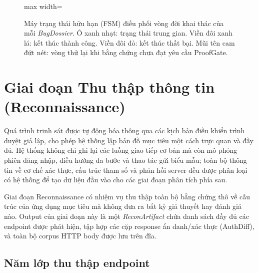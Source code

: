\begin{figure}[H]
\begin{adjustbox}{max width=\linewidth}
\end{adjustbox}
\caption{Máy trạng thái hữu hạn (FSM) điều phối vòng đời khai thác của mỗi \textit{BugDossier}.
Ô xanh nhạt: trạng thái trung gian. Viền đôi xanh lá: kết thúc thành công.
Viền đôi đỏ: kết thúc thất bại. Mũi tên cam đứt nét: vòng thử lại khi bằng chứng chưa đạt yêu cầu ProofGate.}
\label{fig:state_machine_tikz}
\end{figure}

\section{Giai đoạn Thu thập thông tin (Reconnaissance)}

Quá trình trinh sát được tự động hóa thông qua các kịch bản điều khiển trình duyệt giả lập, cho phép hệ thống lập bản đồ mục tiêu một cách trực quan và đầy đủ. Hệ thống không chỉ ghi lại các luồng giao tiếp cơ bản mà còn mô phỏng phiên đăng nhập, điều hướng đa bước và thao tác gửi biểu mẫu; toàn bộ thông tin về cơ chế xác thực, cấu trúc tham số và phản hồi server đều được phân loại có hệ thống để tạo dữ liệu đầu vào cho các giai đoạn phân tích phía sau.

Giai đoạn Reconnaissance có nhiệm vụ thu thập toàn bộ bằng chứng thô về cấu trúc của ứng dụng mục tiêu mà không đưa ra bất kỳ giả thuyết hay đánh giá nào. Output của giai đoạn này là một \textit{ReconArtifact} chứa danh sách đầy đủ các endpoint được phát hiện, tập hợp các cặp response ẩn danh/xác thực (AuthDiff), và toàn bộ corpus HTTP body được lưu trên đĩa.

\subsection{Năm lớp thu thập endpoint}

